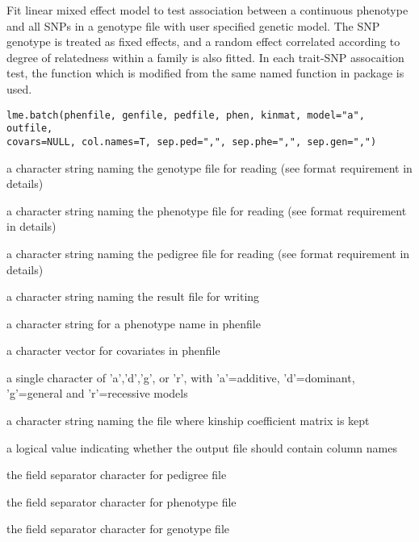 \begin{Description}\relax
Fit linear mixed effect model to test association between a continuous phenotype 
and all SNPs in a genotype file with user specified genetic model. The SNP genotype is treated
as fixed effects, and a random effect correlated according to degree of relatedness within a 
family is also fitted. 
In each trait-SNP assocaition test, the  function which is modified from
the same named function in package  is used.
\end{Description}
\begin{Usage}
\begin{verbatim}
lme.batch(phenfile, genfile, pedfile, phen, kinmat, model="a", outfile, 
covars=NULL, col.names=T, sep.ped=",", sep.phe=",", sep.gen=",")
\end{verbatim}
\end{Usage}
\begin{Arguments}
\begin{ldescription}
\item[\code{genfile}] a character string naming the genotype file for reading (see format requirement in details) 
\item[\code{phenfile}] a character string naming the phenotype file for reading (see format requirement in details) 
\item[\code{pedfile}] a character string naming the pedigree file for reading (see format requirement in details) 
\item[\code{outfile}] a character string naming the result file for writing 
\item[\code{phen}] a character string for a phenotype name in phenfile 
\item[\code{covars}] a character vector for covariates in phenfile 
\item[\code{model}] a single character of 'a','d','g', or 'r', with 'a'=additive, 'd'=dominant, 'g'=general and 'r'=recessive models 
\item[\code{kinmat}] a character string naming the file where kinship coefficient matrix is kept 
\item[\code{col.names}] a logical value indicating whether the output file should contain column names 
\item[\code{sep.ped}] the field separator character for pedigree file 
\item[\code{sep.phe}] the field separator character for phenotype file 
\item[\code{sep.gen}] the field separator character for genotype file 
\end{ldescription}
\end{Arguments}
